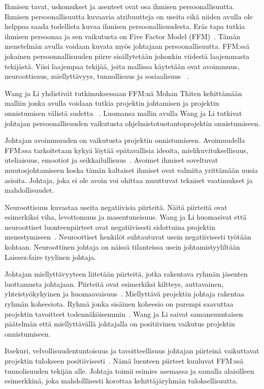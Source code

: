 \documentclass[finnish]{tktltiki2}
\theoremstyle{definition}
\theoremstyle{remark}
\begin{document}
Ihmisen tavat, uskomukset ja asenteet ovat osa ihmisen persoonallisuutta. Ihmisen persoonallisuutta kuvaavia atribuutteja on useita eikä niiden avulla ole helppoa saada todellista kuvaa ihmisen persoonallisuudesta. Eräs tapa tutkia ihmisen persoonaa ja sen vaikutusta on Five Factor Model (FFM)~\cite{barrick2006big}. Tämän menetelmän avulla voidaan kuvata myös johtajaan persoonallisuutta. FFM:ssä jokainen persoonnallisuuden piirre sisällytetään johonkin viidestä laajemmasta tekijästä. Viisi laajempaa tekijää, joita mallissa käytetään ovat avoimmuus, neuroottisuus, miellyttävyys, tunnollisuus ja sosiaalisuus ~\cite{barrick2006big}.

Wang ja Li yhdistivät tutkimuksessaan FFM:nä Mohan Thiten kehittämään malliin jonka avulla voidaan tutkia projektin johtamisen ja projektin onnistumisen välistä sudetta ~\cite{Wang:2009:PMP:1639950.1640049}. Luomansa mallin avulla Wang ja Li tutkivat johtajan persoonallisuuden vaikutusta ohjelmistotuotantoprojektin onnistumiseen. 

Johtajan avoimmuuden on vaikutusta projektin onnistumiseen. Avoimuudella FFM:ssa tarkoitetaan kykyä löytää epätavallisia ideoita, mielikuvituksellisuus, uteliaisuus, emootiot ja seikkailullisuus~\cite{Wang:2009:PMP:1639950.1640049}. Avoimet ihmiset soveltuvat muutosjohtamiseen koska tämän kaltaiset ihmiset ovat valmiita yrittämään uusia asioita. Johtaja, joka ei ole avoin voi ohittaa muuttuvat tekniset vaatimukset ja mahdollisuudet. 

Neuroottisuus kuvastaa useita negatiivisia piirteitä. Näitä piirteitä ovat esimerkiksi viha, levottomuus ja masentuneisuus. Wang ja Li huomasivat että neuroottiset luonteenpiirteet ovat negatiivisesti sidottuina projektin menestymiseen~\cite{Wang:2009:PMP:1639950.1640049}. Neuroottiset henkilöt suhtautuvat usein negatiivisesti työtään kohtaan. Neuroottinen johtaja on näissä tilanteissa usein johtamistyyliltään Laissez-faire tyylinen johtaja.

Johtajan miellyttävyyteen liitetään piirteitä, jotka rakentava ryhmän jäsenten luottamusta johtajaan. Piirteitä ovat esimerkiksi kiltteys, auttavainen, yhteistyökykyinen ja huomaavaisuus~\cite{Wang:2009:PMP:1639950.1640049}. Miellyttävä projektin johtaja rakentaa ryhmän koheesiota. Ryhmä jonka sisäinen koheesio on parempi saavuttaa projektin tavoitteet todennäköisemmin~\cite{bahli2005group}. Wang ja Li saivat samansuuntaisen päätelmän että miellyttävällä johtajalla on positiivinen vaikutus projektin onnistumiseen.

Itsekuri, velvollisuudentuntoisuus ja tavoitteellisuus johtajan piirteinä vaikuttavat projektin tulokseen positiivisesti~\cite{Wang:2009:PMP:1639950.1640049}. Nämä luenteen piirteet kuuluvat FFM:ssä tunnolisuuden tekijän alle. Johtaja toimii esimies asemassa ja samalla alaisilleen esimerkkinä, joka mahdolllisesti korottaa kehittäjäryhmän tuloksellisuutta. 
\end{document}
